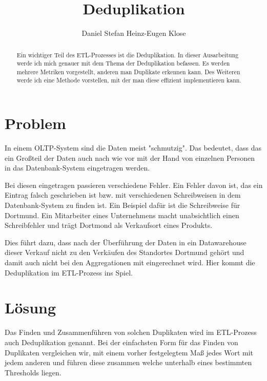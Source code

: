 \documentclass[sigconf]{acmart}
\begin{document}
\title{Deduplikation}

\author{Daniel Stefan Heinz-Eugen Klose}


\begin{abstract}
  Ein wichtiger Teil des ETL-Prozesses ist die Deduplikation.
  In dieser Ausarbeitung werde ich mich genauer mit dem Thema
  der Deduplikation
  befassen. Es werden mehrere Metriken vorgestellt, anderen
  man Duplikate erkennen kann.
  Des Weiteren werde ich eine Methode vorstellen, mit der man
  diese effizient implementieren kann.

\end{abstract}

\maketitle

\section*{Problem}
In einem OLTP-System sind die Daten meist "schmutzig". Das bedeutet, dass 
das ein Großteil der Daten auch nach wie vor mit der Hand von einzelnen
Personen in das Datenbank-System eingetragen werden. 

Bei diesen eingetragen
passieren verschiedene Fehler. Ein Fehler davon ist, das ein Eintrag falsch
geschrieben ist bzw. mit verschiedenen Schreibweisen in dem Datenbank-System
zu finden ist. Ein Beispiel dafür ist die Schreibweise für Dortmund.
Ein Mitarbeiter eines Unternehmens macht unabsichtlich einen
Schreibfehler und trägt Dortmond als Verkaufsort eines Produkts.

Dies führt dazu, dass nach der Überführung der Daten in ein
Datawarehouse dieser Verkauf nicht zu den Verkäufen des Standortes Dortmund
gehört und damit auch nicht bei den Aggregationen mit eingerechnet wird.
Hier kommt die Deduplikation im ETL-Prozess ins Spiel.

\section*{Lösung}
Das Finden und Zusammenführen von solchen Duplikaten wird im ETL-Prozess
auch Deduplikation genannt. Bei der einfachsten Form für das Finden von
Duplikaten vergleichen wir, mit einem vorher festgelegtem Maß jedes Wort
mit jedem anderen und führen diese zusammen welche unterhalb eines
bestimmten Thresholds liegen.
\end{document}
